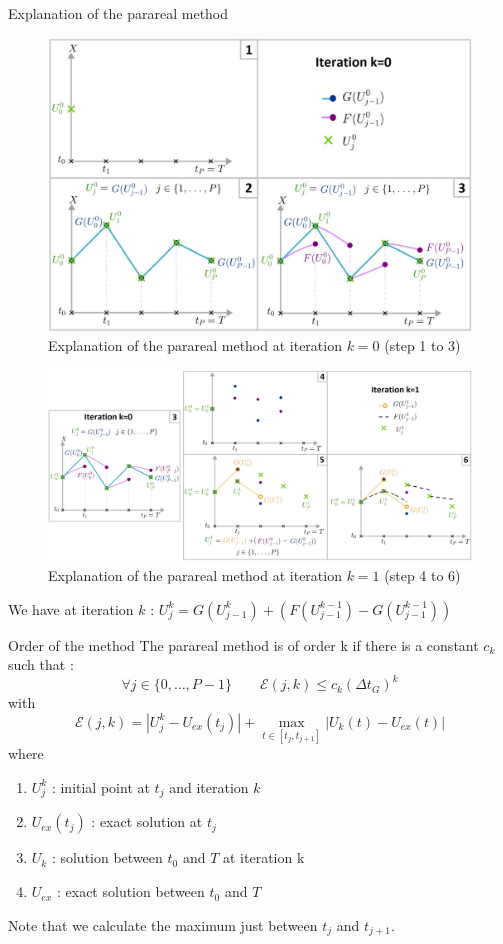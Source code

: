 \begin{frame}[allowframebreaks]{Explanation of the parareal method}
	\begin{figure}
		\centering
		\includegraphics[width=0.6\linewidth]{images/parareal/parareal_k0.jpg}
		\caption{Explanation of the parareal method at iteration $k=0$ (step 1 to 3)}
	\end{figure}
	\begin{figure}
		\centering
		\includegraphics[width=0.9\linewidth]{images/parareal/parareal_k1.jpg}
		\caption{Explanation of the parareal method at iteration $k=1$ (step 4 to 6)}
	\end{figure}
	\small
	We have at iteration $k$ : \qquad	$U_j^k=G(U_{j-1}^k)+(F(U_{j-1}^{k-1})-G(U_{j-1}^{k-1}))$
\end{frame}

\begin{frame}{Order of the method}
	The parareal method is of order k if there is a constant $c_k$ such that :
	\begin{equation*}
		\forall j\in\{0,\dots,P-1\} \qquad \mathcal{E}(j,k)\le c_k(\Delta t_G)^k
	\end{equation*}
	with
	$$\mathcal{E}(j,k)=|U_j^k-U_{ex}(t_j)|+\max_{t\in[t_j,t_{j+1}]}|U_k(t)-U_{ex}(t)|$$
	where 
	\begin{enumerate}[\textbullet]
		\item $U_j^k$ : initial point at $t_j$ and iteration $k$
		\item $U_{ex}(t_j)$ : exact solution at $t_j$
		\item $U_k$ : solution between $t_0$ and $T$ at iteration k
		\item $U_{ex}$ : exact solution between $t_0$ and $T$
	\end{enumerate}
	Note that we calculate the maximum just between $t_j$ and $t_{j+1}$.
\end{frame}

